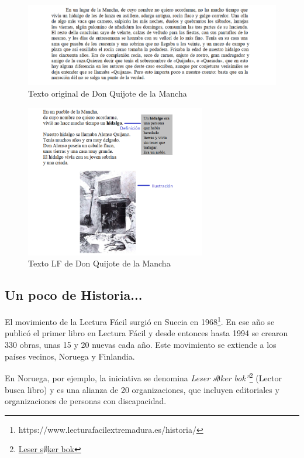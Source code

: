 \begin{figure}[htb]
	\centering
	\includegraphics[width=1.15\textwidth]{Imagenes/Ejemplos/Cap1DonQuijote}
	\caption{Texto original de Don Quijote de la Mancha}
	\label{fig:Quijote}
\end{figure} 


\begin{figure}[htb]
	\centering
	\includegraphics[width=0.7\textwidth]{Imagenes/Ejemplos/Cap1DonQuijoteLF}
	\caption{Texto LF de Don Quijote de la Mancha}
	\label{fig:QuijoteLF}
\end{figure}


\subsection{Un poco de Historia...}
El movimiento de la Lectura Fácil surgió en Suecia en 1968\footnote{https://www.lecturafacilextremadura.es/historia/}. En ese año se publicó el primer libro en Lectura Fácil y desde entonces hasta 1994 se crearon 330 obras, unas 15 y 20 nuevas cada año. Este movimiento se extiende a los países vecinos, Noruega y Finlandia.

En Noruega, por ejemplo, la iniciativa se denomina \textit{Leser s$\emptyset$ker bok”}\footnote{\href{https://lesersokerbok.no/english/}{Leser s$\emptyset$ker bok}} (Lector busca libro) y es una alianza de 20 organizaciones, que incluyen editoriales y organizaciones de personas con discapacidad.

